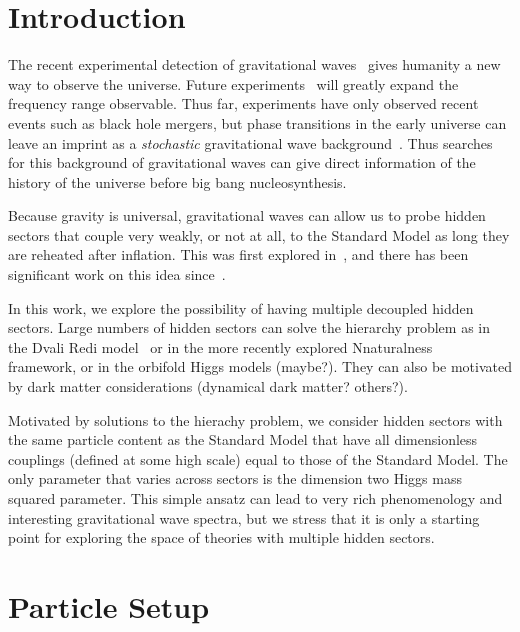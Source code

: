 \documentclass[nofootinbib,twocolumn,preprintnumbers]{revtex4-1}
\begin{document}
\maketitle

\section{Introduction} 
\label{sec:intro} 

The recent experimental detection of gravitational waves~\cite{} gives humanity a new way to observe the universe. Future experiments~\cite{} will greatly expand the frequency range observable. Thus far, experiments have only observed recent events such as black hole mergers, but phase transitions in the early universe can leave an imprint as a \textit{stochastic} gravitational wave background~\cite{}. Thus searches for this background of gravitational waves can give direct information of the history of the universe before big bang nucleosynthesis. 

Because gravity is universal, gravitational waves can allow us to probe hidden sectors that couple very weakly, or not at all, to the Standard Model as long they are reheated after inflation. This was first explored in~\cite{Schwaller:2015tja}, and there has been significant work on this idea since~\cite{}. 

In this work, we explore the possibility of having multiple decoupled hidden sectors. Large numbers of hidden sectors can solve the hierarchy problem as in the Dvali Redi model~\cite{Dvali:2009ne} or in the more recently explored Nnaturalness~\cite{Arkani-Hamed:2016rle} framework, or in the orbifold Higgs models (maybe?\cite{}). They can also be motivated by dark matter considerations (dynamical dark matter? others?). 

Motivated by solutions to the hierachy problem, we consider hidden sectors with the same particle content as the Standard Model that have all dimensionless couplings (defined at some high scale) equal to those of the Standard Model. The only parameter that varies across sectors is the dimension two Higgs mass squared parameter. This simple ansatz can lead to very rich phenomenology and interesting gravitational wave spectra, but we stress that it is only a starting point for exploring the space of theories with multiple hidden sectors.
 
\section{Particle Setup}
\label{sec:nn}
\end{document}
